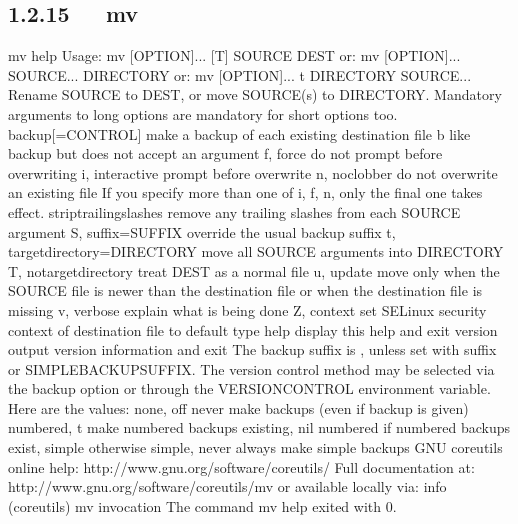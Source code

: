 \documentclass[letterpaper,12pt,english]{sphinxmanual}
\begin{document}
\subsection{1.2.15   mv}
\label{\detokenize{001software/001install/linux:mv}}
\begin{sphinxVerbatim}[commandchars=\\\{\}]
\PYGZdl{} mv \PYGZhy{}\PYGZhy{}help
Usage: mv [OPTION]... [\PYGZhy{}T] SOURCE DEST
  or:  mv [OPTION]... SOURCE... DIRECTORY
  or:  mv [OPTION]... \PYGZhy{}t DIRECTORY SOURCE...
Rename SOURCE to DEST, or move SOURCE(s) to DIRECTORY.
Mandatory arguments to long options are mandatory for short options too.
      \PYGZhy{}\PYGZhy{}backup[=CONTROL]       make a backup of each existing    destination file
  \PYGZhy{}b                           like \PYGZhy{}\PYGZhy{}backup but does not accept an    argument
  \PYGZhy{}f, \PYGZhy{}\PYGZhy{}force                  do not prompt before overwriting
  \PYGZhy{}i, \PYGZhy{}\PYGZhy{}interactive            prompt before overwrite
  \PYGZhy{}n, \PYGZhy{}\PYGZhy{}no\PYGZhy{}clobber             do not overwrite an existing file
If you specify more than one of \PYGZhy{}i, \PYGZhy{}f, \PYGZhy{}n, only the final one takes    effect.
      \PYGZhy{}\PYGZhy{}strip\PYGZhy{}trailing\PYGZhy{}slashes  remove any trailing slashes from each    SOURCE
                                 argument
  \PYGZhy{}S, \PYGZhy{}\PYGZhy{}suffix=SUFFIX          override the usual backup suffix
  \PYGZhy{}t, \PYGZhy{}\PYGZhy{}target\PYGZhy{}directory=DIRECTORY  move all SOURCE arguments into    DIRECTORY
  \PYGZhy{}T, \PYGZhy{}\PYGZhy{}no\PYGZhy{}target\PYGZhy{}directory    treat DEST as a normal file
  \PYGZhy{}u, \PYGZhy{}\PYGZhy{}update                 move only when the SOURCE file is newer
                                 than the destination file or when the
                                 destination file is missing
  \PYGZhy{}v, \PYGZhy{}\PYGZhy{}verbose                explain what is being done
  \PYGZhy{}Z, \PYGZhy{}\PYGZhy{}context                set SELinux security context of    destination
                                 file to default type
      \PYGZhy{}\PYGZhy{}help     display this help and exit
      \PYGZhy{}\PYGZhy{}version  output version information and exit
The backup suffix is \PYGZsq{}\PYGZti{}\PYGZsq{}, unless set with \PYGZhy{}\PYGZhy{}suffix or    SIMPLE\PYGZus{}BACKUP\PYGZus{}SUFFIX.
The version control method may be selected via the \PYGZhy{}\PYGZhy{}backup option or    through
the VERSION\PYGZus{}CONTROL environment variable.  Here are the values:
  none, off       never make backups (even if \PYGZhy{}\PYGZhy{}backup is given)
  numbered, t     make numbered backups
  existing, nil   numbered if numbered backups exist, simple otherwise
  simple, never   always make simple backups
GNU coreutils online help: \PYGZlt{}http://www.gnu.org/software/coreutils/\PYGZgt{}
Full documentation at: \PYGZlt{}http://www.gnu.org/software/coreutils/mv\PYGZgt{}
or available locally via: info \PYGZsq{}(coreutils) mv invocation\PYGZsq{}
The command \PYGZdq{}mv \PYGZhy{}\PYGZhy{}help\PYGZdq{} exited with 0.
\end{sphinxVerbatim}
\end{document}
